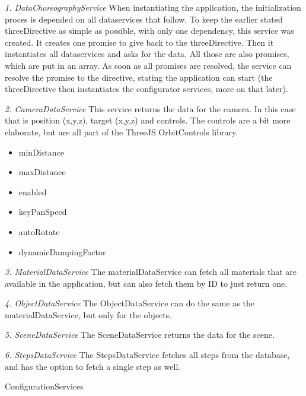 \textit{1. DataChoreographyService} \newline
When instantiating the application, the initialization proces is depended on all dataservices that follow. To keep the earlier stated threeDirective as simple as possible, with only one dependency, this service was created. It creates one promise to give back to the threeDirective. Then it instantiates all dataservices and asks for the data. All those are also promises, which are put in an array. As soon as all promises are resolved, the service can resolve the promise to the directive, stating the application can start (the threeDirective then instantiates the configurator services, more on that later).

\textit{2. CameraDataService} \newline
This service returns the data for the camera. In this case that is position (x,y,z), target (x,y,z) and controls. The controls are a bit more elaborate, but are all part of the ThreeJS OrbitControls library.
\begin{itemize}
	\item minDistance
	\item maxDistance
	\item enabled
	\item keyPanSpeed
	\item autoRotate
	\item dynamicDampingFactor
\end{itemize}

\textit{3. MaterialDataService} \newline
The materialDataService can fetch all materials that are available in the application, but can also fetch them by ID to just return one.

\textit{4. ObjectDataService} \newline
The ObjectDataService can do the same as the materialDataService, but only for the objects.

\textit{5. SceneDataService} \newline
The SceneDataService returns the data for the scene.

\textit{6. StepsDataService} \newline
The StepsDataService fetches all steps from the database, and has the option to fetch a single step as well.

ConfigurationServices \newline

